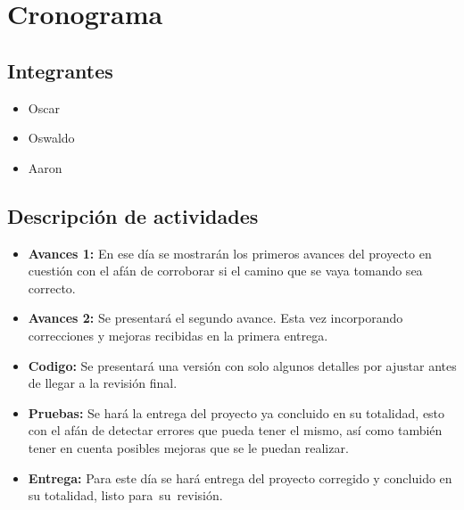 \section*{Cronograma}

\subsection*{Integrantes}
\begin{itemize}
    \item Oscar
    \item Oswaldo
    \item Aaron
\end{itemize}


\subsection*{Descripción de actividades}

\begin{itemize}
    \item \textbf{Avances 1:} En ese día se mostrarán los primeros avances del proyecto en cuestión con el afán de corroborar si el camino que se vaya tomando sea correcto.
    \item \textbf{Avances 2:} Se presentará el segundo avance. Esta vez incorporando correcciones y mejoras recibidas en la primera entrega.
    \item \textbf{Codigo:} Se presentará una versión con solo algunos detalles por ajustar antes de llegar a la revisión final.
    \item \textbf{Pruebas:} Se hará la entrega del proyecto ya concluido en su totalidad, esto con el afán de detectar errores que pueda tener el mismo, así como también tener en cuenta posibles mejoras que se le puedan realizar.
    \item \textbf{Entrega:} Para este día se hará entrega del proyecto corregido y concluido en su totalidad, listo para su revisión.
\end{itemize}
